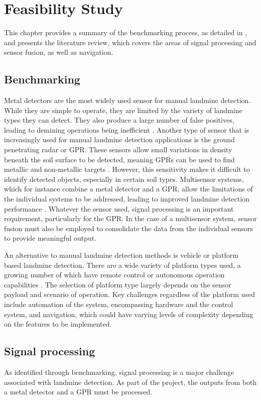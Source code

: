 \documentclass[main.tex]{subfiles}
\begin{document}
\chapter{Feasibility Study}
This chapter provides a summary of the benchmarking process, as detailed in , and presents the literature review, which covers the areas of signal processing and sensor fusion, as well as navigation.

\section{Benchmarking}
Metal detectors are the most widely used sensor for manual landmine detection. While they are simple to operate, they are limited by the variety of landmine types they can detect. They also produce a large number of false positives, leading to demining operations being inefficient \parencite{minelabF3}. Another type of sensor that is increasingly used for manual landmine detection applications is the ground penetrating radar or GPR. These sensors allow small variations in density beneath the soil surface to be detected, meaning GPRs can be used to find metallic and non-metallic targets \parencite{sakaguchi2014}. However, this sensitivity makes it difficult to identify detected objects, especially in certain soil types. Multisensor systems, which for instance combine a metal detector and a GPR, allow the limitations of the individual systems to be addressed, leading to improved landmine detection performance \parencite{Takahashi10}. Whatever the sensor used, signal processing is an important requirement, particularly for the GPR. In the case of a multisensor system, sensor fusion must also be employed to consolidate the data from the individual sensors to provide meaningful output.  

An alternative to manual landmine detection methods is vehicle or platform based landmine detection. There are a wide variety of platform types used, a growing number of which have remote control or autonomous operation capabilities \parencite{portugal2014}. The selection of platform type largely depends on the sensor payload and scenario of operation. Key challenges regardless of the platform used include automation of the system, encompassing hardware and the control system, and navigation, which could have varying levels of complexity depending on the features to be implemented. 

\section{Signal processing}
As identified through benchmarking, signal processing is a major challenge associated with landmine detection. As part of the project, the outputs from both a metal detector and a GPR must be processed. 
\end{document}
